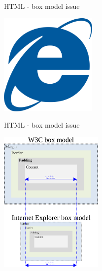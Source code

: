 \begin{frame}{HTML - box model issue}
  \begin{center}
    \includegraphics[height=5cm,keepaspectratio]{sources/images/ie-autovvod.png}
  \end{center}
\end{frame}
\begin{frame}{HTML - box model issue}
  \begin{center}
    \includegraphics[height=7cm,keepaspectratio]{sources/images/ie_box_model_bug.png}
  \end{center}
\end{frame}